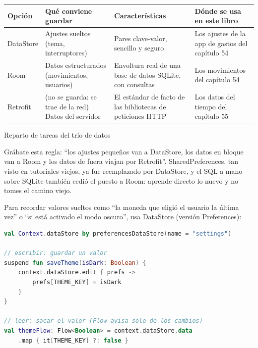 


\begin{center}
\begin{tabularx}{\linewidth}{|X|X|X|X|}
\hline
\textbf{Opción} & \textbf{Qué conviene guardar} & \textbf{Características} & \textbf{Dónde se usa en este libro} \tabularnewline
\hline
DataStore & Ajustes sueltos (tema, interruptores) & Pares clave-valor, sencillo y seguro & Los ajustes de la app de gastos del capítulo 54 \tabularnewline
Room & Datos estructurados (movimientos, usuarios) & Envoltura real de una base de datos SQLite, con consultas & Los movimientos del capítulo 54 \tabularnewline
Retrofit & (no se guarda: se trae de la red) Datos del servidor & El estándar de facto de las bibliotecas de peticiones HTTP & Los datos del tiempo del capítulo 55 \tabularnewline
\hline
\end{tabularx}
\end{center}

\begin{center}\small\color{gray}Reparto de tareas del trío de datos\end{center}

Grábate esta regla: “los ajustes pequeños van a DataStore, los datos en bloque van a Room y los datos de fuera viajan por Retrofit”. SharedPreferences, tan visto en tutoriales viejos, ya fue reemplazado por DataStore, y el SQL a mano sobre SQLite también cedió el puesto a Room: aprende directo lo nuevo y no tomes el camino viejo.


Para recordar valores sueltos como “la moneda que eligió el usuario la última vez” o “si está activado el modo oscuro”, usa DataStore (versión Preferences):

\begin{lstlisting}[language=Kotlin]
val Context.dataStore by preferencesDataStore(name = "settings")

// escribir: guardar un valor
suspend fun saveTheme(isDark: Boolean) {
    context.dataStore.edit { prefs ->
        prefs[THEME_KEY] = isDark
    }
}

// leer: sacar el valor (Flow avisa solo de los cambios)
val themeFlow: Flow<Boolean> = context.dataStore.data
    .map { it[THEME_KEY] ?: false }
\end{lstlisting}

